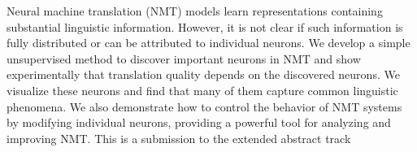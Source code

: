 Neural machine translation (NMT) models learn representations containing substantial linguistic information. However, it is not clear if such information is fully distributed or can be attributed to individual neurons. We develop a simple unsupervised method to discover important neurons in NMT and show experimentally that translation quality depends on the discovered neurons. We visualize these neurons and find that many of them capture common linguistic phenomena. We also demonstrate how to control the behavior of NMT systems by modifying individual neurons, providing a powerful tool for analyzing and improving NMT. This is a submission to the extended abstract track

